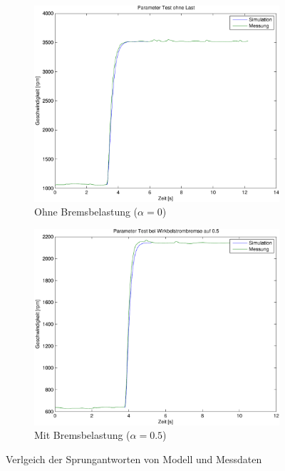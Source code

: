 \begin{figure}[h!]
	\centering
	\begin{subfigure}{0.475\textwidth}
		\includegraphics[width=1\textwidth]{07/parameter_test_noload.pdf}
		\caption{Ohne Bremsbelastung ($\alpha = 0$)}
	\end{subfigure}
	\begin{subfigure}{0.475\textwidth}
		\includegraphics[width=1\textwidth]{07/parameter_test_load.pdf}
		\caption{Mit Bremsbelastung ($\alpha = 0.5$)}
	\end{subfigure}
	\caption{Verlgeich der Sprungantworten von Modell und Messdaten}
\end{figure}

